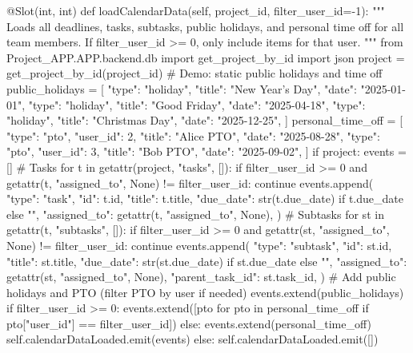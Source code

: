 \documentclass{report}
\begin{document}
\begin{python}
    @Slot(int, int)
    def loadCalendarData(self, project_id, filter_user_id=-1):
        """
        Loads all deadlines, tasks, subtasks, public holidays, and personal time off for all team members.
        If filter_user_id >= 0, only include items for that user.
        """
        from Project_APP.APP.backend.db import get_project_by_id
        import json
        project = get_project_by_id(project_id)
        # Demo: static public holidays and time off
        public_holidays = [
            {"type": "holiday", "title": "New Year's Day", "date": "2025-01-01"},
            {"type": "holiday", "title": "Good Friday", "date": "2025-04-18"},
            {"type": "holiday", "title": "Christmas Day", "date": "2025-12-25"},
        ]
        personal_time_off = [
            {"type": "pto", "user_id": 2, "title": "Alice PTO", "date": "2025-08-28"},
            {"type": "pto", "user_id": 3, "title": "Bob PTO", "date": "2025-09-02"},
        ]
        if project:
            events = []
            # Tasks
            for t in getattr(project, "tasks", []):
                if filter_user_id >= 0 and getattr(t, "assigned_to", None) != filter_user_id:
                    continue
                events.append({
                    "type": "task",
                    "id": t.id,
                    "title": t.title,
                    "due_date": str(t.due_date) if t.due_date else "",
                    "assigned_to": getattr(t, "assigned_to", None),
                })
                # Subtasks
                for st in getattr(t, "subtasks", []):
                    if filter_user_id >= 0 and getattr(st, "assigned_to", None) != filter_user_id:
                        continue
                    events.append({
                        "type": "subtask",
                        "id": st.id,
                        "title": st.title,
                        "due_date": str(st.due_date) if st.due_date else "",
                        "assigned_to": getattr(st, "assigned_to", None),
                        "parent_task_id": st.task_id,
                    })
            # Add public holidays and PTO (filter PTO by user if needed)
            events.extend(public_holidays)
            if filter_user_id >= 0:
                events.extend([pto for pto in personal_time_off if pto["user_id"] == filter_user_id])
            else:
                events.extend(personal_time_off)
            self.calendarDataLoaded.emit(events)
        else:
            self.calendarDataLoaded.emit([])


\end{python}
\end{document}

